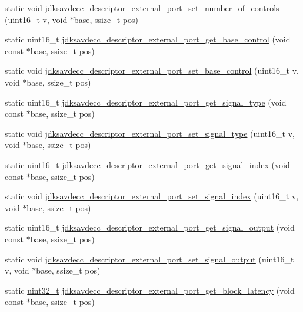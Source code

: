 \begin{DoxyCompactItemize}
\item 
static void \hyperlink{group__descriptor__external__port_gaa68ce59a9db1a0d53554f3caa34608ee}{jdksavdecc\+\_\+descriptor\+\_\+external\+\_\+port\+\_\+set\+\_\+number\+\_\+of\+\_\+controls} (uint16\+\_\+t v, void $\ast$base, ssize\+\_\+t pos)
\item 
static uint16\+\_\+t \hyperlink{group__descriptor__external__port_ga1272176989bcc7802c5eb3a5be6b89f4}{jdksavdecc\+\_\+descriptor\+\_\+external\+\_\+port\+\_\+get\+\_\+base\+\_\+control} (void const $\ast$base, ssize\+\_\+t pos)
\item 
static void \hyperlink{group__descriptor__external__port_gab6998594d56891fc103ec1a05bcb636f}{jdksavdecc\+\_\+descriptor\+\_\+external\+\_\+port\+\_\+set\+\_\+base\+\_\+control} (uint16\+\_\+t v, void $\ast$base, ssize\+\_\+t pos)
\item 
static uint16\+\_\+t \hyperlink{group__descriptor__external__port_ga01e3b4a6a3574e0906adc870924eddca}{jdksavdecc\+\_\+descriptor\+\_\+external\+\_\+port\+\_\+get\+\_\+signal\+\_\+type} (void const $\ast$base, ssize\+\_\+t pos)
\item 
static void \hyperlink{group__descriptor__external__port_ga6c182fd2b085869eab7dd49c8e9ffc4a}{jdksavdecc\+\_\+descriptor\+\_\+external\+\_\+port\+\_\+set\+\_\+signal\+\_\+type} (uint16\+\_\+t v, void $\ast$base, ssize\+\_\+t pos)
\item 
static uint16\+\_\+t \hyperlink{group__descriptor__external__port_ga8c14b30ec5110025834900b1fcb605a9}{jdksavdecc\+\_\+descriptor\+\_\+external\+\_\+port\+\_\+get\+\_\+signal\+\_\+index} (void const $\ast$base, ssize\+\_\+t pos)
\item 
static void \hyperlink{group__descriptor__external__port_ga85cd2dbf6d778f9e0c48a4d325d63941}{jdksavdecc\+\_\+descriptor\+\_\+external\+\_\+port\+\_\+set\+\_\+signal\+\_\+index} (uint16\+\_\+t v, void $\ast$base, ssize\+\_\+t pos)
\item 
static uint16\+\_\+t \hyperlink{group__descriptor__external__port_ga725cdcf03a9131a8512188721524c52c}{jdksavdecc\+\_\+descriptor\+\_\+external\+\_\+port\+\_\+get\+\_\+signal\+\_\+output} (void const $\ast$base, ssize\+\_\+t pos)
\item 
static void \hyperlink{group__descriptor__external__port_ga857faf1aeeeef282340e39aa23d53b3f}{jdksavdecc\+\_\+descriptor\+\_\+external\+\_\+port\+\_\+set\+\_\+signal\+\_\+output} (uint16\+\_\+t v, void $\ast$base, ssize\+\_\+t pos)
\item 
static \hyperlink{parse_8c_a6eb1e68cc391dd753bc8ce896dbb8315}{uint32\+\_\+t} \hyperlink{group__descriptor__external__port_ga12e301300dd4da726c3327f8a28538a9}{jdksavdecc\+\_\+descriptor\+\_\+external\+\_\+port\+\_\+get\+\_\+block\+\_\+latency} (void const $\ast$base, ssize\+\_\+t pos)

\end{DoxyCompactItemize}
